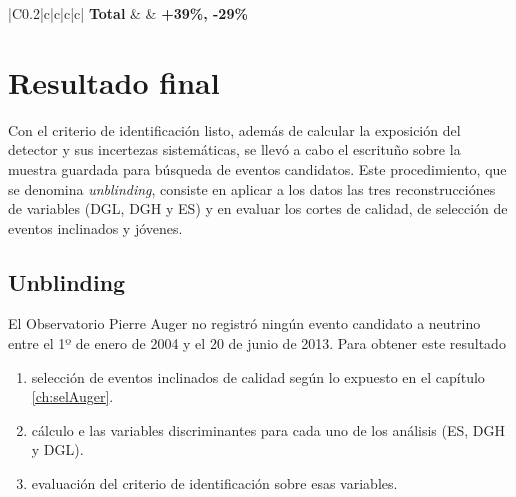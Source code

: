 \begin{table}[ht!]
\begin{tabular}{|C{0.2\textwidth}|c|c|c|c|}
		\hline
		\hline
		{\bf Total}                     &   {}  & {\bf +39\%, -29\%}         \\
		\hline
		\end{tabular}
		\caption{Resumen de las fuentes de error sistemático consideradas en este trabajo. Luego de obtener la estimación debida a cada fuebte para cada canal se combinaron utilizando la ecuación \ref{eq:sistErr03}, lo que se muestra en la última columna. Por último el error en la exposición total se obtuvo sumando en cuadratura los valores expuestos en la última columna.}
		\label{tab:sist}
	\end{table}

\section{Resultado final}

Con el criterio de identificaci\'on listo, adem\'as de calcular la exposici\'on del detector y sus incertezas sistem\'aticas, se llev\'o a cabo el escritu\~no sobre la muestra guardada para b\'usqueda de eventos candidatos.
Este procedimiento, que se denomina \emph{unblinding}, consiste en aplicar a los datos las tres reconstrucci\'ones de variables (DGL, DGH y ES) y en evaluar los cortes de calidad, de selecci\'on de eventos inclinados y j\'ovenes.


	
	\subsection{Unblinding}
	
	El Observatorio Pierre Auger no registr\'o ning\'un evento candidato a neutrino entre el 1º de enero de 2004 y el 20 de junio de 2013.
	Para obtener este resultado 
	\begin{enumerate}
	 \item selecci\'on de eventos inclinados de calidad seg\'un lo expuesto en el cap\'itulo \ref{ch:selAuger}. 
	 \item c\'alculo e las variables discriminantes para cada uno de los an\'alisis (ES, DGH y DGL).
	 \item evaluaci\'on del criterio de identificaci\'on sobre esas variables.
	\end{enumerate}

